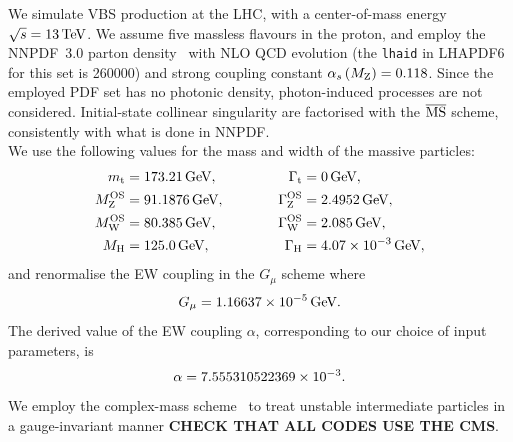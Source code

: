 We simulate VBS production at the LHC, with a center-of-mass energy $\sqrt s = 13 \,\text{TeV}$. We assume five massless flavours in the proton, and employ the NNPDF~3.0 parton 
density~\cite{Ball:2014uwa}
with NLO QCD evolution (the {\tt lhaid} in LHAPDF6~\cite{Buckley:2014ana} for this set is 260000) and strong coupling constant $\alpha_s\left( M_\text{Z} \right) = 0.118$. Since
the employed PDF set has no photonic density, photon-induced processes are not considered. Initial-state collinear singularity are factorised with the  ${\overline{\rm MS}}$ 
scheme, consistently with what is done in NNPDF.\\
We use the following values for the mass and width of the massive particles:
% 
\begin{alignat}{2}
                  m_\text{t}   &=  173.21\,\text{GeV},       & \quad \quad \quad \Gamma_\text{t} &= 0 \,\text{GeV},  \nonumber \\
                M_\text{Z}^\text{OS} &=  91.1876\,\text{GeV},      & \quad \quad \quad \Gamma_\text{Z}^\text{OS} &= 2.4952\,\text{GeV},  \nonumber \\
                M_\text{W}^\text{OS} &=  80.385\,\text{GeV},       & \Gamma_\text{W}^\text{OS} &= 2.085\,\text{GeV},  \nonumber \\
                M_{\rm H} &=  125.0\,\text{GeV},       &  \Gamma_\text{H}   &=  4.07 \times 10^{-3}\,\text{GeV},
\end{alignat}
and renormalise the EW coupling in the $G_\mu$ scheme \cite{Denner:2000bj} where
\begin{equation}
    G_{\mu}    = 1.16637\times 10^{-5}\,\text{GeV}.
\end{equation}
The derived value of the EW coupling $\alpha$, corresponding to our choice of input parameters, is 
\begin{equation}
 \alpha = 7.555310522369 \times 10^{-3}. \\
\end{equation}
We employ the complex-mass scheme~\cite{} to treat unstable intermediate particles in a gauge-invariant manner {\bf CHECK THAT ALL CODES USE THE CMS}.\\


